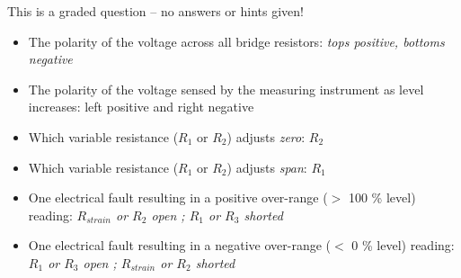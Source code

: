 \vfil 

\eject






This is a graded question -- no answers or hints given!







\begin{itemize}
\item{} The polarity of the voltage across all bridge resistors: {\it tops positive, bottoms negative} 
\item{} The polarity of the voltage sensed by the measuring instrument as level increases: {left positive and right negative}
\item{} Which variable resistance ($R_1$ or $R_2$) adjusts {\it zero}: {\it $R_2$}
\item{} Which variable resistance ($R_1$ or $R_2$) adjusts {\it span}: {\it $R_1$}
\item{} One electrical fault resulting in a positive over-range ($>$ 100 \% level) reading: {\it $R_{strain}$ or $R_2$ open ; $R_1$ or $R_3$ shorted}
\item{} One electrical fault resulting in a negative over-range ($<$ 0 \% level) reading: {\it $R_1$ or $R_3$ open ; $R_{strain}$ or $R_2$ shorted} 
\end{itemize}





